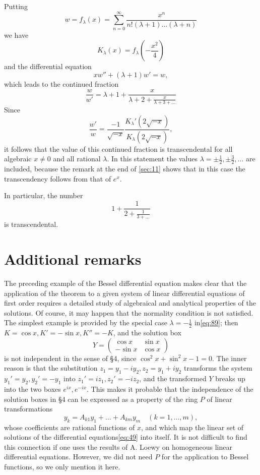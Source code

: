 Putting
\[w = f_\lambda(x) = \sum_{n=0}^\infty \frac{x^n}{n!(\lambda+1)\dots(\lambda+n)}\]
we have
\[K_\lambda(x) = f_\lambda\left(-\frac{x^2}{4}\right)\]
and the differential equation
\[x w'' + (\lambda + 1) w' = w,\]
which leads to the continued fraction
\[\frac{w}{w'} = \lambda + 1 + \frac{x}{\lambda + 2 + \frac{x}{\lambda + 3 + \dots}}\]
Since
\[\frac{w'}{w} = \frac{-1}{\sqrt{-x}} \frac{K_\lambda'(2\sqrt{-x})}{K_\lambda(2\sqrt{-x})},\]
it follows that the value of this continued fraction is transcendental for all algebraic $x \neq 0$ and all rational $\lambda$. In this statement the values $\lambda = \pm \frac{1}{2}, \pm \frac{3}{2}, \dots$ are included, because the remark at the end of \autoref{sec:11} shows that in this case the transcendency follows from that of $e^x$.

In particular, the number
\[1 + \frac{1}{2 + \frac{1}{3 + \dots}}\]
is transcendental.

\section{Additional remarks}

The preceding example of the Bessel differential equation makes clear that the application of the theorem to a given system of linear differential equations of first order requires a detailed study of algebraical and analytical properties of the solutions. Of course, it may happen that the normality condition is not satisfied. The simplest example is provided by the special case $\lambda = -\frac{1}{2}$ in\eqref{eq:89}; then $K = \cos x, K' = -\sin x, K'' = -K$, and the solution box
\[Y = \begin{pmatrix} \cos x & \sin x \\ -\sin x & \cos x \end{pmatrix}\]
is not independent in the sense of \S 4, since $\cos^2 x + \sin^2 x - 1 = 0$. The inner reason is that the substitution $z_1 = y_1 - i y_2, z_2 = y_1 + i y_2$ transforms the system $y_1' = y_2, y_2' = -y_1$ into $z_1' = i z_1, z_2' = -i z_2$, and the transformed $Y$ breaks up into the two boxes $e^{ix}, e^{-ix}$. This makes it probable that the independence of the solution boxes in \S 4 can be expressed as a property of the ring $P$ of linear transformations
\[y_k = A_{k1} y_1 + \dots + A_{km} y_m \quad (k=1,\dots,m),\]
whose coefficients are rational functions of $x$, and which map the linear set of solutions of the differential equations\eqref{eq:49} into itself. It is not difficult to find this connection if one uses the results of A. Loewy on homogeneous linear differential equations. However, we did not need $P$ for the application to Bessel functions, so we only mention it here.

